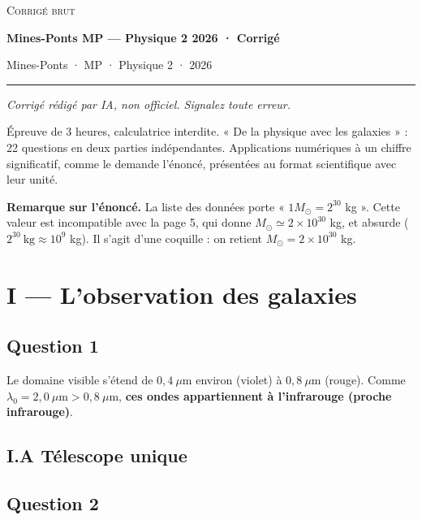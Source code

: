 \documentclass[11pt,a4paper]{article}
\begin{document}
\thispagestyle{plain}
\begin{center}
  {\small\scshape Corrigé brut}\par\smallskip
  {\LARGE\bfseries Mines-Ponts MP — Physique 2 2026 · Corrigé\par}\medskip
  {\large Mines-Ponts · MP · Physique 2 · 2026\par}
\end{center}
\vspace{2pt}\hrule\vspace{8pt}

\emph{Corrigé rédigé par IA, non officiel. Signalez toute erreur.}

Épreuve de 3 heures, calculatrice interdite. « De la physique avec les galaxies » : 22 questions en deux parties indépendantes. Applications numériques à un chiffre significatif, comme le demande l'énoncé, présentées au format scientifique avec leur unité.

\textbf{Remarque sur l'énoncé.} La liste des données porte « \(1M_\odot=2^{30}\) kg ». Cette valeur est incompatible avec la page 5, qui donne \(M_\odot\simeq2\times10^{30}\) kg, et absurde (\(2^{30}\ \mathrm{kg}\approx10^9\) kg). Il s'agit d'une coquille : on retient \(M_\odot=2\times10^{30}\) kg.

\hypertarget{i-lobservation-des-galaxies}{%
\section{I --- L'observation des galaxies}\label{i-lobservation-des-galaxies}}

\hypertarget{question-1}{%
\subsection{Question 1}\label{question-1}}

Le domaine visible s'étend de \(0{,}4\ \mu\mathrm m\) environ (violet) à \(0{,}8\ \mu\mathrm m\) (rouge). Comme \(\lambda_0=2{,}0\ \mu\mathrm m>0{,}8\ \mu\mathrm m\), \textbf{ces ondes appartiennent à l'infrarouge (proche infrarouge)}.

\hypertarget{i.a-tuxe9lescope-unique}{%
\subsection{I.A Télescope unique}\label{i.a-tuxe9lescope-unique}}

\hypertarget{question-2}{%
\subsection{Question 2}\label{question-2}}
\end{document}
